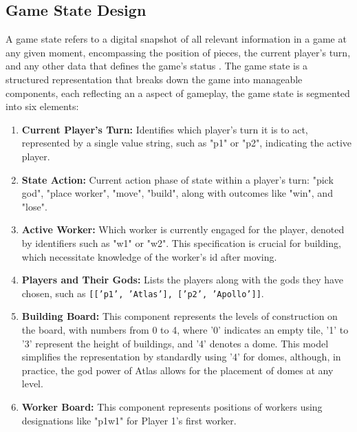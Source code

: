 \documentclass{telkomnika}
\begin{document}
\subsection{Game State Design}
A game state refers to a digital snapshot of all relevant information in a game at any given moment, encompassing the position of pieces, the current player's turn, and any other data that defines the game's status \cite{Jarvinen2007}. The game state is a structured representation that breaks down the game into manageable components, each reflecting an a aspect of gameplay, the game state is segmented into six elements:
\begin{enumerate}
    \item \textbf{Current Player's Turn:} Identifies which player's turn it is to act, represented by a single value string, such as "p1" or "p2", indicating the active player.
    \item \textbf{State Action:} Current action phase of state within a player's turn: "pick god", "place worker", "move", "build", along with outcomes like "win", and "lose".
    \item \textbf{Active Worker:} Which worker is currently engaged for the player, denoted by identifiers such as "w1" or "w2". This specification is crucial for building, which necessitate knowledge of the worker's id after moving.
    \item \textbf{Players and Their Gods:} Lists the players along with the gods they have chosen, such as \texttt{[['p1', 'Atlas'], ['p2', 'Apollo']]}.
    \item \textbf{Building Board:} This component represents the levels of construction on the board, with numbers from 0 to 4, where '0' indicates an empty tile, '1' to '3' represent the height of buildings, and '4' denotes a dome. This model simplifies the representation by standardly using '4' for domes, although, in practice, the god power of Atlas allows for the placement of domes at any level.
    \item \textbf{Worker Board:} This component represents positions of workers using designations like "p1w1" for Player 1's first worker.
\end{enumerate}
\end{document}
